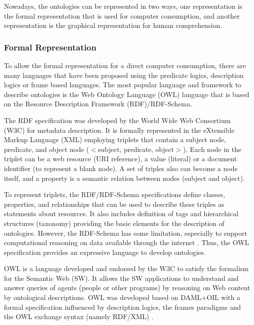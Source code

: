 Nowadays, the ontologies can be represented in two ways, one representation is the formal representation that is used for computer consumption, and another representation is the graphical representation for human comprehension.

\subsubsection{Formal Representation}
\label{subsubsec:formal-representation}

To allow the formal representation for a direct computer consumption, there are many languages that have been proposed using the predicate logics, description logics or frame based languages. The most popular language and framework to describe ontologies is the Web Ontology Language (OWL) language that is based on the Resource Description Framework (RDF)/RDF-Schema.

The RDF specification was developed by the World Wide Web Consortium (W3C) for metadata description. It is formally represented in the eXtensible Markup Language (XML) employing triplets that contain a subject node, predicate, and object node ($<$subject, predicate, object$>$). Each node in the triplet can be a web resource (URI reference), a value (literal) or a document identifier (to represent a blank node). A set of triples also can become a node itself, and a property is a semantic relation between nodes (subject and object).

To represent triplets, the RDF/RDF-Schema specifications define classes, properties, and relationships that can be used to describe these triples as statements about resources. It also includes definition of tags and hierarchical structures (taxonomy) providing the basic elements for the description of ontologies. However, the RDF-Schema has some limitation, especially to support computational reasoning on data available through the internet \cite{Patel-Schneider2005}. Thus, the OWL specification provides an expressive language to develop ontologies.

OWL is a language developed and endorsed by the W3C to satisfy the formalism for the Semantic Web (SW). It allows the SW applications to understand and answer queries of agents (people or other programs) by reasoning on Web content by ontological descriptions. OWL was developed based on DAML+OIL \cite{Horrocksothers2002} with a formal specification influenced by description logics, the frames paradigms and the OWL exchange syntax (namely RDF/XML) \cite{HorrocksPatel-SchneidervanHarmelen2003}.

